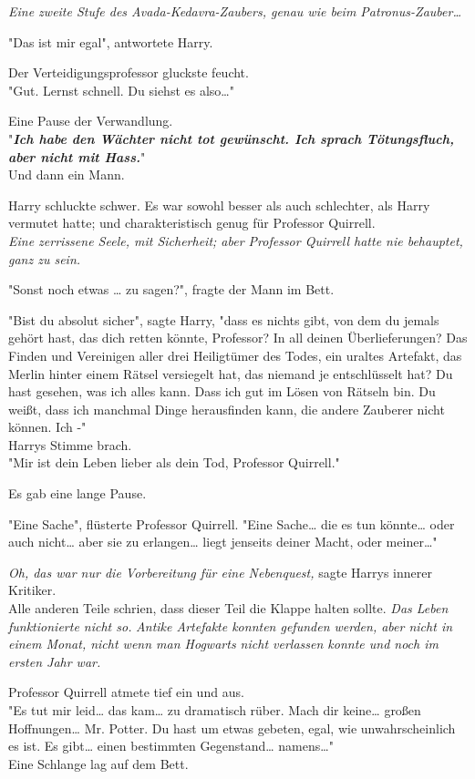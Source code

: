 {\emph{Eine zweite Stufe des Avada-Kedavra-Zaubers, genau wie beim Patronus-Zauber…}

"Das ist mir egal", antwortete Harry.

Der Verteidigungsprofessor gluckste feucht.\\ "Gut. Lernst schnell. Du siehst es also…"

Eine Pause der Verwandlung.\\ "\textbf{\emph{Ich habe den Wächter nicht tot gewünscht. Ich sprach Tötungsfluch, aber nicht mit Hass.}}"\\ Und dann ein Mann.

Harry schluckte schwer. Es war sowohl besser als auch schlechter, als Harry vermutet hatte; und charakteristisch genug für Professor Quirrell.\\ \emph{Eine zerrissene Seele, mit Sicherheit; aber Professor Quirrell hatte nie behauptet, ganz zu sein.}

"Sonst noch etwas … zu sagen?", fragte der Mann im Bett.

"Bist du absolut sicher", sagte Harry, "dass es nichts gibt, von dem du jemals gehört hast, das dich retten könnte, Professor? In all deinen Überlieferungen? Das Finden und Vereinigen aller drei Heiligtümer des Todes, ein uraltes Artefakt, das Merlin hinter einem Rätsel versiegelt hat, das niemand je entschlüsselt hat? Du hast gesehen, was ich alles kann. Dass ich gut im Lösen von Rätseln bin. Du weißt, dass ich manchmal Dinge herausfinden kann, die andere Zauberer nicht können. Ich -"\\ Harrys Stimme brach.\\ "Mir ist dein Leben lieber als dein Tod, Professor Quirrell."

Es gab eine lange Pause.

"Eine Sache", flüsterte Professor Quirrell. "Eine Sache… die es tun könnte… oder auch nicht… aber sie zu erlangen… liegt jenseits deiner Macht, oder meiner…"

\emph{Oh, das war nur die Vorbereitung für eine Nebenquest,} sagte Harrys innerer Kritiker.\\ Alle anderen Teile schrien, dass dieser Teil die Klappe halten sollte. \emph{Das Leben funktionierte nicht so.} \emph{Antike Artefakte konnten gefunden werden, aber nicht in einem Monat, nicht wenn man Hogwarts nicht verlassen konnte und noch im ersten Jahr war.}

Professor Quirrell atmete tief ein und aus.\\ "Es tut mir leid… das kam… zu dramatisch rüber. Mach dir keine… großen Hoffnungen… Mr. Potter. Du hast um etwas gebeten, egal, wie unwahrscheinlich es ist. Es gibt… einen bestimmten Gegenstand… namens…"\\ Eine Schlange lag auf dem Bett.\\

}
